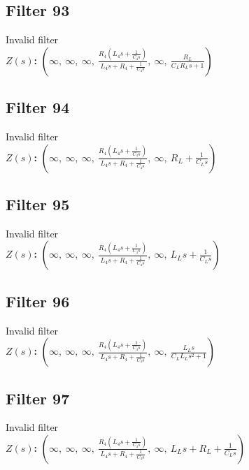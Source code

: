 \documentclass{article}
\begin{document}
\subsection*{Filter 93}
Invalid filter \\ 
\textbf{$Z(s)$:} $\left( \infty, \  \infty, \  \infty, \  \frac{R_{4} \left(L_{4} s + \frac{1}{C_{4} s}\right)}{L_{4} s + R_{4} + \frac{1}{C_{4} s}}, \  \infty, \  \frac{R_{L}}{C_{L} R_{L} s + 1}\right)$ \\ 
\subsection*{Filter 94}
Invalid filter \\ 
\textbf{$Z(s)$:} $\left( \infty, \  \infty, \  \infty, \  \frac{R_{4} \left(L_{4} s + \frac{1}{C_{4} s}\right)}{L_{4} s + R_{4} + \frac{1}{C_{4} s}}, \  \infty, \  R_{L} + \frac{1}{C_{L} s}\right)$ \\ 
\subsection*{Filter 95}
Invalid filter \\ 
\textbf{$Z(s)$:} $\left( \infty, \  \infty, \  \infty, \  \frac{R_{4} \left(L_{4} s + \frac{1}{C_{4} s}\right)}{L_{4} s + R_{4} + \frac{1}{C_{4} s}}, \  \infty, \  L_{L} s + \frac{1}{C_{L} s}\right)$ \\ 
\subsection*{Filter 96}
Invalid filter \\ 
\textbf{$Z(s)$:} $\left( \infty, \  \infty, \  \infty, \  \frac{R_{4} \left(L_{4} s + \frac{1}{C_{4} s}\right)}{L_{4} s + R_{4} + \frac{1}{C_{4} s}}, \  \infty, \  \frac{L_{L} s}{C_{L} L_{L} s^{2} + 1}\right)$ \\ 
\subsection*{Filter 97}
Invalid filter \\ 
\textbf{$Z(s)$:} $\left( \infty, \  \infty, \  \infty, \  \frac{R_{4} \left(L_{4} s + \frac{1}{C_{4} s}\right)}{L_{4} s + R_{4} + \frac{1}{C_{4} s}}, \  \infty, \  L_{L} s + R_{L} + \frac{1}{C_{L} s}\right)$ \\ 
\end{document}

